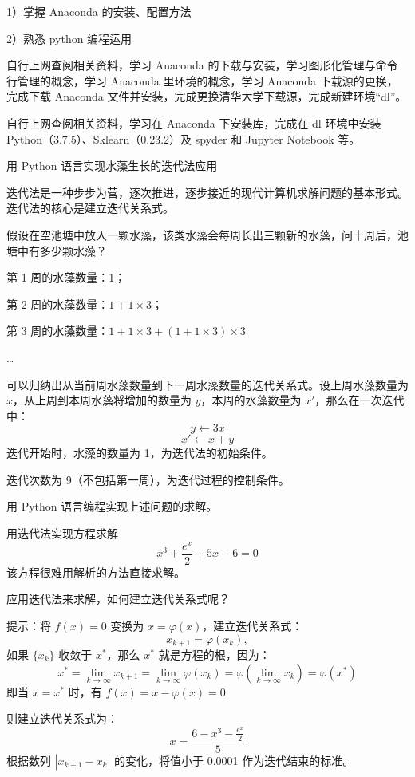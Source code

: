 \documentclass{sdxxexp}
\begin{document}
\makecover

\makereportheader
\cqutBeginReportBody

1）掌握 Anaconda 的安装、配置方法\par
2）熟悉 python 编程运用


自行上网查阅相关资料，学习 Anaconda 的下载与安装，学习图形化管理与命令行管理的概念，学习 Anaconda 里环境的概念，学习 Anaconda 下载源的更换，完成下载 Anaconda 文件并安装，完成更换清华大学下载源，完成新建环境“dl”。\par
\vspace{0.8ex}
自行上网查阅相关资料，学习在 Anaconda 下安装库，完成在 dl 环境中安装 Python（3.7.5）、Sklearn（0.23.2）及 spyder 和 Jupyter Notebook 等。\par
\vspace{0.8ex}
用 Python 语言实现水藻生长的迭代法应用\par
迭代法是一种步步为营，逐次推进，逐步接近的现代计算机求解问题的基本形式。迭代法的核心是建立迭代关系式。\par
假设在空池塘中放入一颗水藻，该类水藻会每周长出三颗新的水藻，问十周后，池塘中有多少颗水藻？\par
第 1 周的水藻数量：1；\par
第 2 周的水藻数量：$1 + 1 \times 3$；\par
第 3 周的水藻数量：$1 + 1 \times 3 + (1 + 1 \times 3) \times 3$\par
…\par
可以归纳出从当前周水藻数量到下一周水藻数量的迭代关系式。设上周水藻数量为 $x$，从上周到本周水藻将增加的数量为 $y$，本周的水藻数量为 $x'$，那么在一次迭代中：
\[
  y \leftarrow 3x
\]
\[
  x' \leftarrow x + y
\]
迭代开始时，水藻的数量为 1，为迭代法的初始条件。

迭代次数为 9（不包括第一周），为迭代过程的控制条件。\par
用 Python 语言编程实现上述问题的求解。\par
\vspace{0.8ex}
用迭代法实现方程求解
\[
  x^3 + \frac{e^x}{2} + 5x - 6 = 0
\]
该方程很难用解析的方法直接求解。\par
应用迭代法来求解，如何建立迭代关系式呢？\par
提示：将 $f(x) = 0$ 变换为 $x = \varphi(x)$，建立迭代关系式：
\[
  x_{k+1} = \varphi(x_k),
\]
如果 $\{x_k\}$ 收敛于 $x^*$，那么 $x^*$ 就是方程的根，因为：
\[
  x^* = \lim_{k\to\infty} x_{k+1} = \lim_{k\to\infty} \varphi(x_k) = \varphi\left(\lim_{k\to\infty} x_k\right) = \varphi(x^*)
\]
即当 $x = x^*$ 时，有 $f(x) = x - \varphi(x) = 0$\par
则建立迭代关系式为：
\[
  x = \frac{6 - x^3 - \frac{e^x}{2}}{5}
\]
根据数列 $|x_{k+1} - x_k|$ 的变化，将值小于 0.0001 作为迭代结束的标准。
\end{document}
